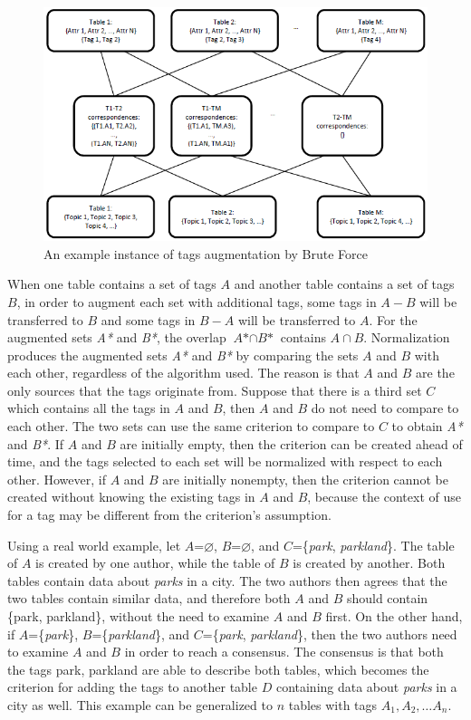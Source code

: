 \begin{figure}
    \centering
    \includegraphics[width=5in]{figures/an-example-instance-brute-force.png}
    \caption{An example instance of tags augmentation by Brute Force}
    \label{fig:an-example-instance-brute-force}
\end{figure}

When one table contains a set of tags $A$ and another table contains a set of tags $B$, in order to augment each set with additional tags, some tags in $A-B$ will be transferred to $B$ and some tags in $B-A$ will be transferred to $A$. For the augmented sets \textit{A*} and \textit{B*}, the overlap $\textit{A*}\cap\textit{B*}$ contains $A\cap B$. Normalization produces the augmented sets \textit{A*} and \textit{B*} by comparing the sets $A$ and $B$ with each other, regardless of the algorithm used. The reason is that $A$ and $B$ are the only sources that the tags originate from. Suppose that there is a third set $C$ which contains all the tags in $A$ and $B$, then $A$ and $B$ do not need to compare to each other. The two sets can use the same criterion to compare to $C$ to obtain \textit{A*} and \textit{B*}. If $A$ and $B$ are initially empty, then the criterion can be created ahead of time, and the tags selected to each set will be normalized with respect to each other. However, if $A$ and $B$ are initially nonempty, then the criterion cannot be created without knowing the existing tags in $A$ and $B$, because the context of use for a tag may be different from the criterion\textquoteright s assumption.

Using a real world example, let $A$=\ensuremath{\varnothing}, $B$=\ensuremath{\varnothing}, and $C$=\{\textit{park}, \textit{parkland}\}. The table of $A$ is created by one author, while the table of $B$ is created by another. Both tables contain data about \textit{parks} in a city. The two authors then agrees that the two tables contain similar data, and therefore both $A$ and $B$ should contain \{park, parkland\}, without the need to examine $A$ and $B$ first. On the other hand, if $A$=\{\textit{park}\}, $B$=\{\textit{parkland}\}, and $C$=\{\textit{park}, \textit{parkland}\}, then the two authors need to examine $A$ and $B$ in order to reach a consensus. The consensus is that both the tags park, parkland are able to describe both tables, which becomes the criterion for adding the tags to another table $D$ containing data about \textit{parks} in a city as well. This example can be generalized to $n$ tables with tags $A_1, A_2, \dots A_n$. 

